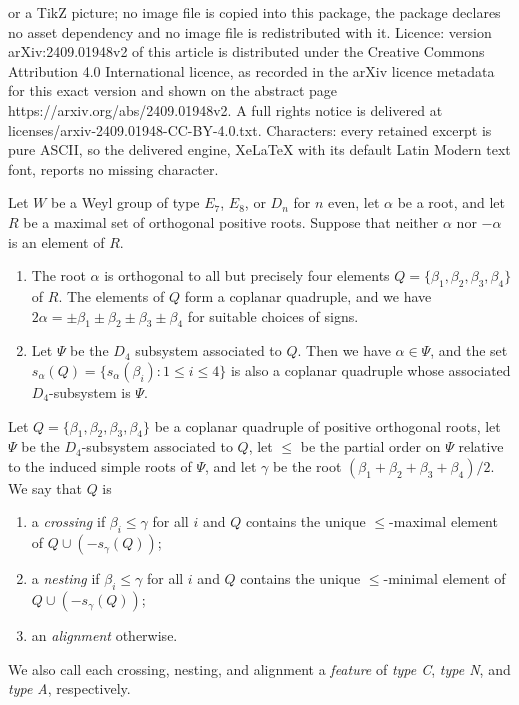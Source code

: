 \documentclass[10pt,a4paper]{amsart}
\newcommand{\al}{\alpha}
\newcommand{\be}{\beta}
\newcommand{\coplanar}{coplanar\xspace}
\begin{document}
or a TikZ picture; no image file is copied into this package, the package declares no asset dependency and no image file is redistributed with it. Licence: version arXiv:2409.01948v2 of this article is distributed under the Creative Commons Attribution 4.0 International licence, as recorded in the arXiv licence metadata for this exact version and shown on the abstract page https://arxiv.org/abs/2409.01948v2. A full rights notice is delivered at licenses/arxiv-2409.01948-CC-BY-4.0.txt. Characters: every retained excerpt is pure ASCII, so the delivered engine, XeLaTeX with its default Latin Modern text font, reports no missing character.
\begin{prop}\label{prop:four}
Let $W$ be a Weyl group of type $E_7$, $E_8$, or $D_n$ for $n$ even, let $\al$
be a root, and let $R$ be a maximal set of orthogonal positive roots. Suppose
that neither $\al$ nor $-\al$ is an element of $R$.
\begin{enumerate}
    \item[{\rm (i)}] The root $\al$ is orthogonal to all but precisely four
     elements $Q = \{\be_1, \be_2, \be_3, \be_4\}$ of $R$.  The elements of $Q$
     form a \coplanar quadruple, and we have $ 2\al = \pm \be_1 \pm \be_2 \pm
     \be_3 \pm \be_4$ for suitable choices of signs.
 \item[{\rm (ii)}] Let $\Psi$ be the $D_4$ subsystem associated to $Q$. Then we
     have $\alpha\in \Psi$, and the set $s_\al(Q)=\{s_\al(\be_i):1\le i\le 4\}$
     is also a \coplanar quadruple whose associated $D_4$-subsystem is $\Psi$.
\end{enumerate}
\end{prop}

\begin{defn}\label{def:nestcross}
Let $Q = \{\be_1, \be_2, \be_3, \be_4\}$ be a \coplanar quadruple of positive
orthogonal roots, let $\Psi$ be the $D_4$-subsystem associated to $Q$, let
$\leq$ be the partial order on $\Psi$ relative to the induced simple roots of
$\Psi$, and let $\gamma$ be the root $(\be_1 + \be_2 + \be_3 + \be_4)/2$. We say
that $Q$ is
\begin{enumerate}
    \item[{\rm (i)}]{a {\it crossing} if $\be_i \leq \gamma$ for all $i$ and $Q$
     contains the unique $\leq$-maximal element of $Q \cup (-s_\gamma(Q))$;}
 \item[{\rm (ii)}]{a {\it nesting} if $\be_i \leq \gamma$ for all $i$ and $Q$
     contains the unique $\leq$-minimal element of $Q \cup (-s_\gamma(Q))$;}
 \item[{\rm (iii)}]{an {\it alignment} otherwise.}
\end{enumerate} We also call each crossing, nesting, and alignment a
    \emph{feature} of \emph{type C}, \emph{type N}, and \emph{type A},
    respectively.
\end{defn}
\end{document}

